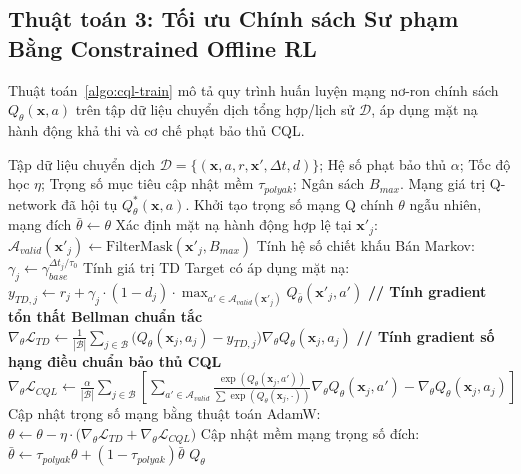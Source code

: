 \subsection{Thuật toán 3: Tối ưu Chính sách Sư phạm Bằng Constrained Offline RL}\label{subsec:algo-cql-train}
Thuật toán~\ref{algo:cql-train} mô tả quy trình huấn luyện mạng nơ-ron chính sách $Q_\theta(\mathbf{x}, a)$ trên tập dữ liệu chuyển dịch tổng hợp/lịch sử $\mathcal{D}$, áp dụng mặt nạ hành động khả thi và cơ chế phạt bảo thủ CQL.

\begin{algorithm}[H]
\caption{Huấn luyện Chính sách Sư phạm Offline bằng Constrained CQL}\label{algo:cql-train}
\begin{algorithmic}[1]
\Require Tập dữ liệu chuyển dịch $\mathcal{D} = \{(\mathbf{x}, a, r, \mathbf{x}', \Delta t, d)\}$; Hệ số phạt bảo thủ $\alpha$; Tốc độ học $\eta$; Trọng số mục tiêu cập nhật mềm $\tau_{polyak}$; Ngân sách $B_{max}$.
\Ensure Mạng giá trị Q-network đã hội tụ $Q_\theta^*(\mathbf{x}, a)$.
\State Khởi tạo trọng số mạng Q chính $\theta$ ngẫu nhiên, mạng đích $\bar{\theta} \leftarrow \theta$
            \State Xác định mặt nạ hành động hợp lệ tại $\mathbf{x}'_j$: $\mathcal{A}_{valid}(\mathbf{x}'_j) \leftarrow \text{FilterMask}(\mathbf{x}'_j, B_{max})$
            \State Tính hệ số chiết khấu Bán Markov: $\gamma_j \leftarrow \gamma_{base}^{\Delta t_j / \tau_0}$
            \State Tính giá trị TD Target có áp dụng mặt nạ:
            \State $y_{TD, j} \leftarrow r_j + \gamma_j \cdot (1 - d_j) \cdot \max_{a' \in \mathcal{A}_{valid}(\mathbf{x}'_j)} Q_{\bar{\theta}}(\mathbf{x}'_j, a')$
        \EndFor
        \State \textbf{// Tính gradient tổn thất Bellman chuẩn tắc}
        \State $\nabla_\theta \mathcal{L}_{TD} \leftarrow \frac{1}{|\mathcal{B}|} \sum_{j \in \mathcal{B}} \big(Q_\theta(\mathbf{x}_j, a_j) - y_{TD, j}\big) \nabla_\theta Q_\theta(\mathbf{x}_j, a_j)$
        \State \textbf{// Tính gradient số hạng điều chuẩn bảo thủ CQL}
        \State $\nabla_\theta \mathcal{L}_{CQL} \leftarrow \frac{\alpha}{|\mathcal{B}|} \sum_{j \in \mathcal{B}} \left[ \sum_{a' \in \mathcal{A}_{valid}} \frac{\exp(Q_\theta(\mathbf{x}_j, a'))}{\sum \exp(Q_\theta(\mathbf{x}_j, \cdot))} \nabla_\theta Q_\theta(\mathbf{x}_j, a') - \nabla_\theta Q_\theta(\mathbf{x}_j, a_j) \right]$
        \State Cập nhật trọng số mạng bằng thuật toán AdamW:
        \State $\theta \leftarrow \theta - \eta \cdot \big(\nabla_\theta \mathcal{L}_{TD} + \nabla_\theta \mathcal{L}_{CQL}\big)$
        \State Cập nhật mềm mạng trọng số đích: $\bar{\theta} \leftarrow \tau_{polyak} \theta + (1 - \tau_{polyak}) \bar{\theta}$
    \EndFor
\EndFor
\State \Return $Q_\theta$
\end{algorithmic}
\end{algorithm}

